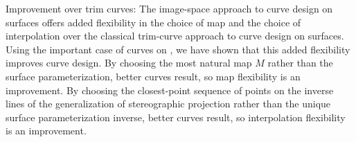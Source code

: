 
Improvement over trim curves:
The image-space approach to curve design on surfaces offers
added flexibility in the choice of map and the choice of interpolation
over the classical trim-curve approach to curve design on surfaces.
Using the important case of curves on , 
we have shown that this added flexibility improves curve design.
By choosing the most natural map $M$ rather than the surface parameterization,
better curves result, so map flexibility is an improvement.
By choosing the closest-point sequence of points on the inverse lines
of the generalization of stereographic projection
rather than the unique surface parameterization inverse,
better curves result, so interpolation flexibility is an improvement.

